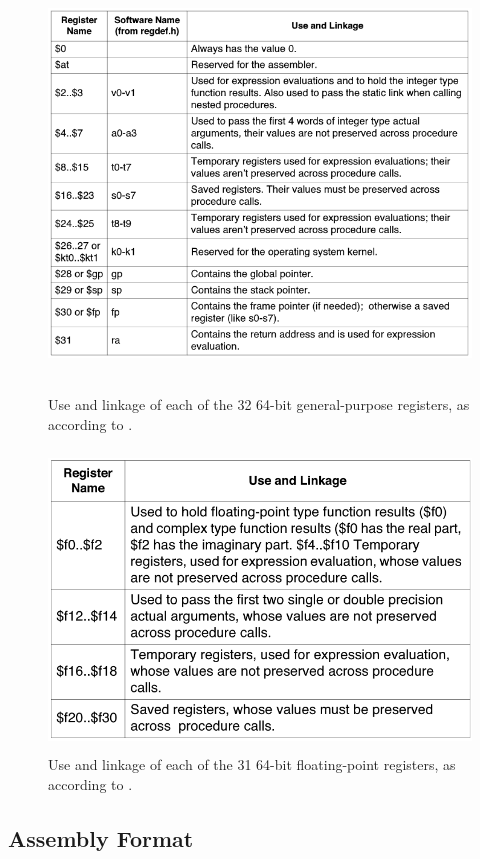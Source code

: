 \documentclass[
    paper=letter,
    parskip=half,
    fontsize=12pt,
    titlepage=firstiscover,
    toc=bibliography,
    numbers=endperiod
]{scrartcl}
\begin{document}
\begin{figure}[H]
    \includegraphics[height=11cm]{gpr-names}
    \caption{Use and linkage of each of the 32 64-bit general-purpose registers, as according to \protect\cite[Table~1-1]{mips-programmers-guide}.}
\end{figure}

\begin{figure}[H]
    \includegraphics[height=8cm]{fpr-names}
    \caption{Use and linkage of each of the 31 64-bit floating-point
    registers, as according to \protect\cite[Table~1-3]{mips-programmers-guide}.}
\end{figure}

\subsection{Assembly Format}
\end{document}
